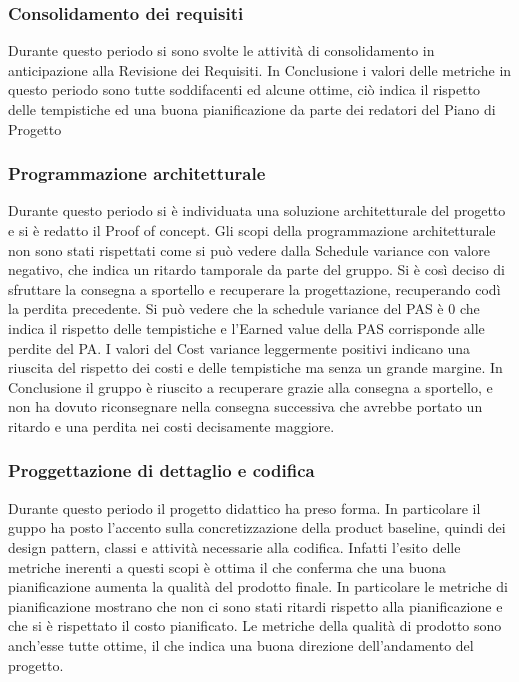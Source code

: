 \subsubsection{Consolidamento dei requisiti}
Durante questo periodo si sono svolte le attività di consolidamento in anticipazione alla Revisione dei Requisiti.
In Conclusione i valori delle metriche in questo periodo sono tutte soddifacenti ed alcune ottime, ciò indica il rispetto delle tempistiche ed una buona pianificazione da parte dei redatori del Piano di Progetto

\subsubsection{Programmazione architetturale}
Durante questo periodo si è individuata una soluzione architetturale del progetto e si è redatto il Proof of concept.
Gli scopi della programmazione architetturale non sono stati rispettati come si può vedere dalla Schedule variance con valore negativo, che indica un ritardo tamporale da parte del gruppo.
Si è così deciso di sfruttare la consegna a sportello e recuperare la progettazione, recuperando codì la perdita precedente. Si può vedere che la schedule variance del PAS è 0 che indica il rispetto delle tempistiche e l'Earned value della PAS corrisponde alle perdite del PA.
I valori del Cost variance leggermente positivi indicano una riuscita del rispetto dei costi e delle tempistiche ma senza un grande margine.
In Conclusione il gruppo è riuscito a recuperare grazie alla consegna a sportello, e non ha dovuto riconsegnare nella consegna successiva che avrebbe portato un ritardo e una perdita nei costi decisamente maggiore.

\subsubsection{Proggettazione di dettaglio e codifica}

Durante questo periodo il progetto didattico ha preso forma. In particolare il guppo ha posto l'accento sulla concretizzazione della product baseline, quindi dei design pattern, classi e attività necessarie alla codifica.
Infatti l'esito delle metriche inerenti a questi scopi è ottima il che conferma che una buona pianificazione aumenta la qualità del prodotto finale.
In particolare le metriche di pianificazione mostrano che non ci sono stati ritardi rispetto alla pianificazione e che si è rispettato il costo pianificato.
Le metriche della qualità di prodotto sono anch'esse tutte ottime, il che indica una buona direzione dell'andamento del progetto.

